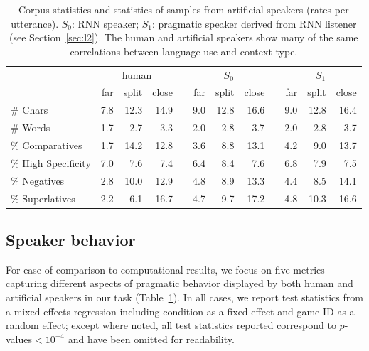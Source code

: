 \documentclass[11pt,letterpaper]{article}
\newcommand{\Speaker}{S}
\renewcommand{\|}{\mid}
\newcommand{\secref}[1]{Section~\ref{#1}}
\newcommand{\tabref}[1]{Table~\ref{#1}}
\begin{document}
\begin{table}[ht]
\centering
\renewcommand{\arraystretch}{0.9}
\begin{tabular}{lrrrr@{\hspace{20pt}}rrrr@{\hspace{20pt}}rrr}
  \toprule
  & \multicolumn{3}{c}{human}&& \multicolumn{3}{c}{$\Speaker_0$}&& \multicolumn{3}{c}{$\Speaker_1$}\\
  & far& split& close&& far& split& close&& far& split& close\\ \midrule
  \# Chars            & 7.8 & 12.3 & 14.9 && 9.0 & 12.8 & 16.6 && 9.0 & 12.8 & 16.4 \\
  \# Words            & 1.7 & 2.7 & 3.3   && 2.0 & 2.8 & 3.7   && 2.0 & 2.8 & 3.7   \\
  \% Comparatives     & 1.7 & 14.2 & 12.8 && 3.6 & 8.8 & 13.1  && 4.2 & 9.0 & 13.7  \\
  \% High Specificity & 7.0 & 7.6 & 7.4   && 6.4 & 8.4 & 7.6   && 6.8 & 7.9 & 7.5   \\
  \% Negatives        & 2.8 & 10.0 & 12.9 && 4.8 & 8.9 & 13.3  && 4.4 & 8.5 & 14.1  \\
  \% Superlatives     & 2.2 & 6.1 & 16.7  && 4.7 & 9.7 & 17.2  && 4.8 & 10.3 & 16.6 \\
   \bottomrule
\end{tabular}
\caption{Corpus statistics and statistics of samples from artificial speakers
  (rates per utterance). $\Speaker_0$: RNN speaker; $\Speaker_1$: pragmatic speaker 
  derived from RNN listener (see \secref{sec:l2}). The human and artificial speakers
  show many of the same correlations between language use and context type.}
\label{table:metrics}
\end{table}

\subsection{Speaker behavior} \label{sec:speaker_behavior}

For ease of comparison to computational results, we focus on five
metrics capturing different aspects of pragmatic behavior
displayed by both human and artificial speakers in our task
(\tabref{table:metrics}). In all cases, we report test statistics from a mixed-effects regression including condition as a fixed effect and game ID as a random effect; except where noted, all test statistics reported correspond to $p$-values${}<10^{-4}$ and have been omitted for readability.
\end{document}
